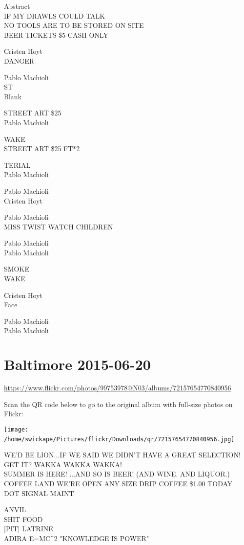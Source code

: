 \documentclass[10pt,letterpaper]{article}
\begin{document}
Abstract\\
IF MY DRAWLS COULD TALK\\
NO TOOLS ARE TO BE STORED ON SITE\\
BEER TICKETS \$5 CASH ONLY

Cristen Hoyt\\
DANGER

Pablo Machioli\\
ST\\
Blank

STREET ART \$25\\
Pablo Machioli

WAKE\\
STREET ART \$25 FT*2

TERIAL\\
Pablo Machioli

Pablo Machioli\\
Cristen Hoyt

Pablo Machioli\\
MISS TWIST WATCH CHILDREN

Pablo Machioli\\
Pablo Machioli

SMOKE\\
WAKE

Cristen Hoyt\\
Face

Pablo Machioli\\
Pablo Machioli
\

\section*{Baltimore 2015-06-20}

\url{https://www.flickr.com/photos/99753978@N03/albums/72157654770840956}

Scan the QR code below to go to the original album with full-size photos on Flickr:

\texttt{[image: /home/swickape/Pictures/flickr/Downloads/qr/72157654770840956.jpg]}
\

WE'D BE LION...IF WE SAID WE DIDN'T HAVE A GREAT SELECTION!  GET IT?  WAKKA WAKKA WAKKA!\\
SUMMER IS HERE!  ...AND SO IS BEER!  (AND WINE.  AND LIQUOR.)\\
COFFEE LAND WE'RE OPEN ANY SIZE DRIP COFFEE \$1.00 TODAY\\
DOT SIGNAL MAINT

ANVIL\\
SHIT FOOD\\
{[}PIT{]} LATRINE\\
ADIRA E=MC\^{}2 "KNOWLEDGE IS POWER"
\end{document}
